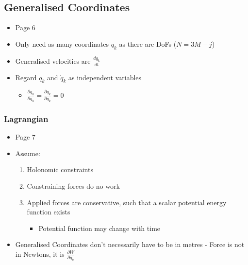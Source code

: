 \documentclass[a4paper,11pt,normalem]{article}
\begin{document}
\subsection{Generalised Coordinates}\label{generalised-coordinates}

\begin{itemize}
\item Page 6
\item Only need as many coordinates \(q_k\) as there are DoFs (\(N = 3M - j\))
\item Generalised velocities are \(\frac{d q_k}{dt}\)
\item Regard \(q_k\) and \(\dot{q}_k\) as independent variables
  \begin{itemize}
  \item
    \(\frac{\partial q_k}{\partial \dot{q}_k} = \frac{\partial \dot{q}_k}{\partial q_k} = 0\)
  \end{itemize}
\end{itemize}

\subsubsection{Lagrangian}\label{lagrangian}

\begin{itemize}
\item
  Page 7
\item
  Assume:
  \begin{enumerate}
  \item
    Holonomic constraints
  \item
    Constraining forces do no work
  \item
    Applied forces are conservative, such that a scalar potential energy
    function exists
    \begin{itemize}
    \item
      Potential function may change with time
    \end{itemize}
  \end{enumerate}
\item
  Generalised Coordinates don't necessarily have to be in metres - Force
  is not in Newtons, it is \(\frac{\partial W}{\partial q_k}\)
\end{itemize}

\section{}
\end{document}

